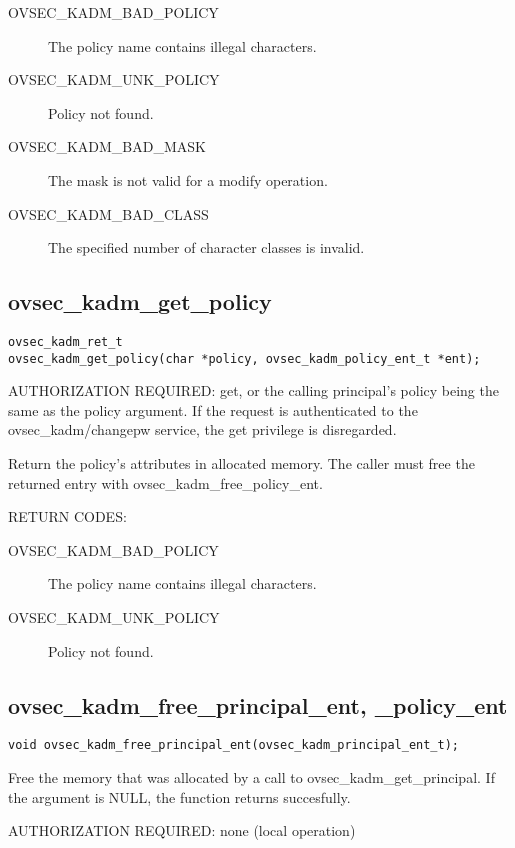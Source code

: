 \begin{description}
\item[OVSEC_KADM_BAD_POLICY] The policy name contains illegal characters.
\item[OVSEC_KADM_UNK_POLICY] Policy not found.
\item[OVSEC_KADM_BAD_MASK] The mask is not valid for a modify
operation.
\item[OVSEC_KADM_BAD_CLASS] The specified number of character classes
is invalid.
\end{description}

\subsection{ovsec_kadm_get_policy}

\begin{verbatim}
ovsec_kadm_ret_t
ovsec_kadm_get_policy(char *policy, ovsec_kadm_policy_ent_t *ent); 
\end{verbatim}

AUTHORIZATION REQUIRED: get, or the calling principal's policy being
the same as the policy argument.  If the request is authenticated to
the ovsec_kadm/changepw service, the get privilege is disregarded.

Return the policy's attributes in allocated memory.  The caller must
free the returned entry with ovsec_kadm_free_policy_ent.

RETURN CODES: 

\begin{description}
\item[OVSEC_KADM_BAD_POLICY] The policy name contains illegal characters.
\item[OVSEC_KADM_UNK_POLICY] Policy not found.
\end{description}

\subsection{ovsec_kadm_free_principal_ent, _policy_ent}

\begin{verbatim}
void ovsec_kadm_free_principal_ent(ovsec_kadm_principal_ent_t);
\end{verbatim}

Free the memory that was allocated by a call to
ovsec_kadm_get_principal.  If the argument is NULL, the function
returns succesfully.

AUTHORIZATION REQUIRED: none (local operation)

